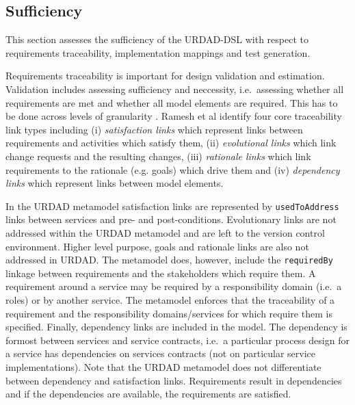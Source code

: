 
\subsection{Sufficiency}

This section assesses the sufficiency of the URDAD-DSL with respect to requirements traceability, implementation mappings and test generation. 

Requirements traceability is important for design validation and estimation. Validation includes assessing sufficiency and neccessity, i.e.\ assessing whether all requirements are met and whether all model elements are required. This has to be done across levels of granularity \cite{dick_design_2005}. Ramesh et al\. \cite{ramesh_toward_2001} identify four core traceability link types including (i) \emph{satisfaction links} which represent links between requirements and activities which satisfy them, (ii) \emph{evolutional links} which link change requests and the resulting changes, (iii) \emph{rationale links} which link requirements to the rationale (e.g. goals) which drive them and (iv) \emph{dependency links} which represent links between model elements.

In the URDAD metamodel satisfaction links are represented by \verb+usedToAddress+ links between services and pre- and post-conditions. Evolutionary links are not addressed within the URDAD metamodel and are left to the version control environment. Higher level purpose, goals and rationale links are also not addressed in URDAD. The metamodel does, however, include the \verb+requiredBy+ linkage between requirements and the stakeholders which require them. A requirement around a service may be required by a responsibility domain (i.e.\ a roles) or by another service. The metamodel enforces that the traceability of a requirement and the responsibility domains/services for which require them is specified. Finally, dependency links are included in the model. The dependency is formost between services and service contracts, i.e.\ a particular process design for a service has dependencies on services contracts (not on particular service implementations). Note that the URDAD metamodel does not differentiate between dependency and satisfaction links. Requirements result in dependencies and if the dependencies are available, the requirements are satisfied.


